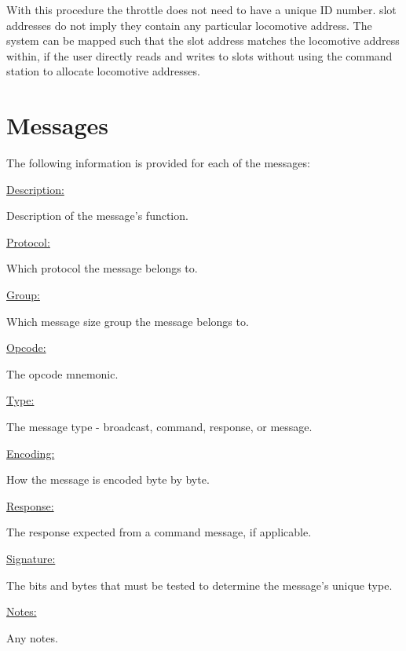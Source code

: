 With this procedure the throttle does not need to have a unique ID number. slot addresses do not imply they contain any particular locomotive address. The system can be mapped such that the slot address matches the locomotive address within, if the user directly reads and writes to slots without using the command station to allocate locomotive addresses.

\section{Messages}

The following information is provided for each of the messages:

\underline{Description:}

Description of the message's function.

\underline{Protocol:}

Which protocol the message belongs to.

\underline{Group:}

Which message size group the message belongs to.

\underline{Opcode:}

The opcode mnemonic.

\underline{Type:}

The message type - broadcast, command, response, or message.

\underline{Encoding:} 

How the message is encoded byte by byte.

\underline{Response:} 

The response expected from a command message, if applicable.

\underline{Signature:}

The bits and bytes that must be tested to determine the message's unique type.

\underline{Notes:} 

Any notes.

